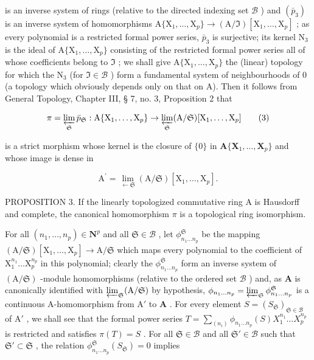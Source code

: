 is an inverse system of rings (relative to the directed indexing set \(\mathcal{B}\) ) and \((\bar{p}_{3})\) is an inverse system of homomorphisms \(\mathrm{A}\{\mathrm{X}_1,\dots ,\mathrm{X}_p\} \to (\mathrm{A} / \Im)[\mathrm{X}_1,\dots ,\mathrm{X}_p]\) ; as every polynomial is a restricted formal power series, \(\bar{p}_{3}\) is surjective; its kernel \(\mathrm{N}_{3}\) is the ideal of \(\mathrm{A}\{\mathrm{X}_1,\dots ,\mathrm{X}_p\}\) consisting of the restricted formal power series all of whose coefficients belong to \(\Im\) ; we shall give \(\mathrm{A}\{\mathrm{X}_1,\dots ,\mathrm{X}_p\}\) the (linear) topology for which the \(\mathrm{N}_{3}\) (for \(\Im \in \mathcal{B}\) ) form a fundamental system of neighbourhoods of 0 (a topology which obviously depends only on that on A). Then it follows from General Topology, Chapter III, § 7, no. 3, Proposition 2 that

\[
\pi = \varprojlim_ {\mathfrak {S}} \bar {p} _ {\mathfrak {S}}: \mathrm{A} \{\mathrm{X} _ {1}, \dots , \mathrm{X} _ {p} \} \rightarrow \varprojlim_ {\mathfrak {S}} (\mathrm{A} / \mathfrak {S}) [ \mathrm{X} _ {1}, \dots , \mathrm{X} _ {p} ]\tag{3}
\]

is a strict morphism whose kernel is the closure of \(\{0\}\) in \(\mathbf{A}\{\mathbf{X}_1,\ldots ,\mathbf{X}_p\}\) and whose image is dense in

\[
\mathrm{A} ^ {\prime} = \lim _ {\leftarrow \mathfrak {S}} (\mathrm{A} / \mathfrak {S}) [ \mathrm{X} _ {1}, \dots , \mathrm{X} _ {p} ].
\]

PROPOSITION 3. If the linearly topologized commutative ring A is Hausdorff and complete, the canonical homomorphism \(\pi\) is a topological ring isomorphism.

For all \((n_1, \ldots, n_p) \in \mathbf{N}^p\) and all \(\mathfrak{S} \in \mathcal{B}\) , let \(\phi_{n_1 \ldots n_p}^{\mathfrak{S}}\) be the mapping \((\mathrm{A} / \mathfrak{S})[\mathrm{X}_1, \ldots, \mathrm{X}_p] \to \mathrm{A} / \mathfrak{S}\) which maps every polynomial to the coefficient of \(\mathrm{X}_1^{n_1} \ldots \mathrm{X}_p^{n_p}\) in this polynomial; clearly the \(\phi_{n_1 \ldots n_p}^{\mathfrak{S}}\) form an inverse system of \((\mathrm{A} / \mathfrak{S})\) -module homomorphisms (relative to the ordered set \(\mathcal{B}\) ) and, as \(\mathbf{A}\) is canonically identified with \(\varprojlim_{\mathfrak{S}} (\mathrm{A} / \mathfrak{S})\) by hypothesis, \(\phi_{n_1 \ldots n_p} = \varprojlim_{\mathfrak{S}} \phi_{n_1 \ldots n_p}^{\mathfrak{S}}\) is a continuous A-homomorphism from \(\mathrm{A}'\) to \(\mathbf{A}\) . For every element \(S = (S_{\mathfrak{S}})_{\mathfrak{S} \in \mathcal{B}}\) of \(\mathrm{A}'\) , we shall see that the formal power series \(T = \sum_{(n_i)} \phi_{n_1 \ldots n_p}(S) X_1^{n_1} \ldots X_p^{n_p}\) is restricted and satisfies \(\pi(T) = S\) . For all \(\mathfrak{S} \in \mathcal{B}\) and all \(\mathfrak{S}' \in \mathcal{B}\) such that \(\mathfrak{S}' \subset \mathfrak{S}\) , the relation \(\phi_{n_1 \ldots n_p}^{\mathfrak{S}}(S_{\mathfrak{S}}) = 0\) implies

